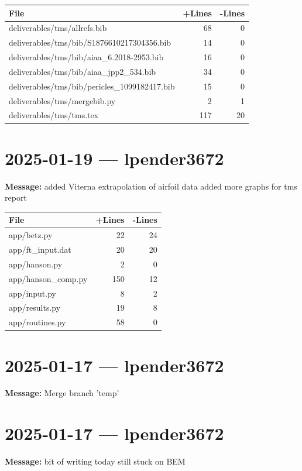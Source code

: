 \documentclass{article}
\begin{document}
\begin{longtable}{|p{10cm}|r|r|}
\hline \textbf{File} & \textbf{+Lines} & \textbf{-Lines} \\
\hline
deliverables/tms/allrefs.bib & 68 & 0 \\
\hline
deliverables/tms/bib/S1876610217304356.bib & 14 & 0 \\
\hline
deliverables/tms/bib/aiaa\_6.2018-2953.bib & 16 & 0 \\
\hline
deliverables/tms/bib/aiaa\_jpp2\_534.bib & 34 & 0 \\
\hline
deliverables/tms/bib/pericles\_1099182417.bib & 15 & 0 \\
\hline
deliverables/tms/mergebib.py & 2 & 1 \\
\hline
deliverables/tms/tms.tex & 117 & 20 \\
\hline
\end{longtable}

\section*{2025-01-19 --- lpender3672}
\textbf{Message:} added Viterna extrapolation of airfoil data added more graphs for tms report

\begin{longtable}{|p{10cm}|r|r|}
\hline \textbf{File} & \textbf{+Lines} & \textbf{-Lines} \\
\hline
app/betz.py & 22 & 24 \\
\hline
app/ft\_input.dat & 20 & 20 \\
\hline
app/hanson.py & 2 & 0 \\
\hline
app/hanson\_comp.py & 150 & 12 \\
\hline
app/input.py & 8 & 2 \\
\hline
app/results.py & 19 & 8 \\
\hline
app/routines.py & 58 & 0 \\
\hline
\end{longtable}

\section*{2025-01-17 --- lpender3672}
\textbf{Message:} Merge branch 'temp'

\section*{2025-01-17 --- lpender3672}
\textbf{Message:} bit of writing today still stuck on BEM
\end{document}
